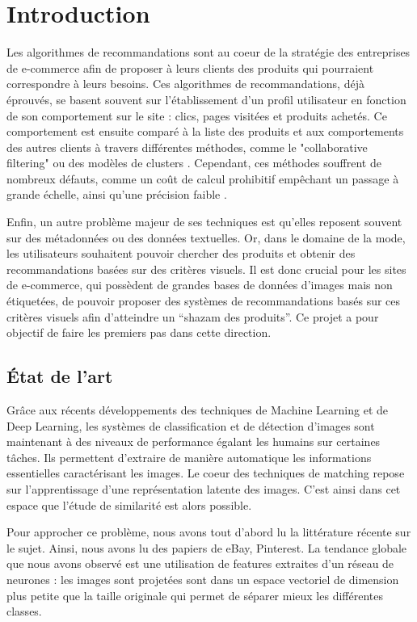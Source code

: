 \section*{Introduction}

Les algorithmes de recommandations sont au coeur de la stratégie des entreprises de e-commerce afin de proposer à leurs
clients des produits qui pourraient correspondre à leurs besoins. Ces algorithmes de recommandations, déjà éprouvés, se
basent souvent sur l'établissement d'un profil utilisateur en fonction de son comportement sur le site : clics, pages
visitées et produits achetés. Ce comportement est ensuite comparé à la liste des produits et aux comportements des
autres clients à travers différentes méthodes, comme le "collaborative filtering" ou des modèles de clusters
\cite{amazon2003linden}. Cependant, ces méthodes souffrent de nombreux défauts, comme un coût de calcul prohibitif
empêchant un passage à grande échelle, ainsi qu'une précision faible \cite{deep2017shankar}.

Enfin, un autre problème majeur de ses techniques est qu'elles reposent souvent sur des métadonnées ou des données
textuelles. Or, dans le domaine de la mode, les utilisateurs souhaitent pouvoir chercher des produits et obtenir des
recommandations basées sur des critères visuels. Il est donc crucial pour les sites de e-commerce, qui possèdent de
grandes bases de données d'images mais non étiquetées, de pouvoir proposer des systèmes de recommandations basés sur
ces critères visuels afin d’atteindre un “shazam des produits”. Ce projet a pour objectif de faire les premiers pas
dans cette direction. 

\subsection*{État de l'art}

Grâce aux récents développements des techniques de Machine Learning et de Deep Learning, les systèmes de classification
et de détection d’images sont maintenant à des niveaux de performance égalant les humains sur certaines tâches. Ils
permettent d’extraire de manière automatique les informations essentielles caractérisant les images.  Le coeur des
techniques de matching repose sur l’apprentissage d’une représentation latente des images. C’est ainsi dans cet espace
que l’étude de similarité est alors possible.

Pour approcher ce problème, nous avons tout d'abord lu la littérature récente sur le sujet. Ainsi, nous avons lu des
papiers de eBay, Pinterest. La tendance globale que nous avons observé est une utilisation de features extraites d'un
réseau de neurones : les images sont projetées sont dans un espace vectoriel de dimension plus petite que la taille
originale qui permet de séparer mieux les différentes classes.


